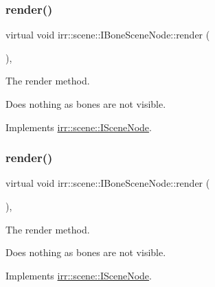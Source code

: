 \mbox{\label{classirr_1_1scene_1_1IBoneSceneNode_ac942248f09d2db69804ea47476e3829e}} 
\subsubsection{\texorpdfstring{render()}{render()}\hspace{0.1cm}{\footnotesize\ttfamily [1/2]}}
{\footnotesize\ttfamily virtual void irr\+::scene\+::\+I\+Bone\+Scene\+Node\+::render (\begin{DoxyParamCaption}{ }\end{DoxyParamCaption})\hspace{0.3cm}{\ttfamily [inline]}, {\ttfamily [virtual]}}



The render method. 

Does nothing as bones are not visible. 

Implements \hyperlink{classirr_1_1scene_1_1ISceneNode_aff530cc4856792101d0aedee51ce35fa}{irr\+::scene\+::\+I\+Scene\+Node}.

\mbox{\label{classirr_1_1scene_1_1IBoneSceneNode_ac942248f09d2db69804ea47476e3829e}} 
\subsubsection{\texorpdfstring{render()}{render()}\hspace{0.1cm}{\footnotesize\ttfamily [2/2]}}
{\footnotesize\ttfamily virtual void irr\+::scene\+::\+I\+Bone\+Scene\+Node\+::render (\begin{DoxyParamCaption}{ }\end{DoxyParamCaption})\hspace{0.3cm}{\ttfamily [inline]}, {\ttfamily [virtual]}}



The render method. 

Does nothing as bones are not visible. 

Implements \hyperlink{classirr_1_1scene_1_1ISceneNode_aff530cc4856792101d0aedee51ce35fa}{irr\+::scene\+::\+I\+Scene\+Node}.

